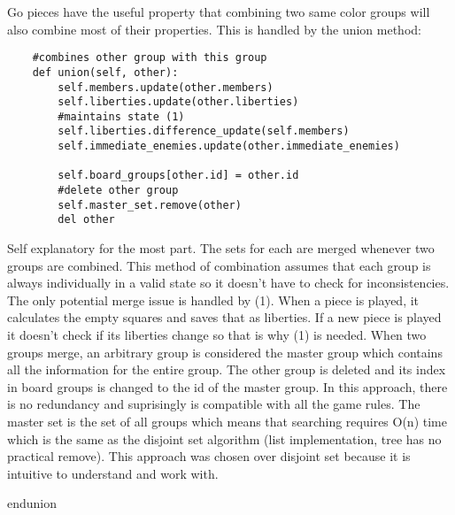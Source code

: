 \documentclass{article}
\begin{document}
        Go pieces have the useful property that combining two same color groups will also combine most of their properties. This is handled by the union method:
\begin{verbatim}
    #combines other group with this group
    def union(self, other):
        self.members.update(other.members)
        self.liberties.update(other.liberties)
        #maintains state (1)
        self.liberties.difference_update(self.members)
        self.immediate_enemies.update(other.immediate_enemies)

        self.board_groups[other.id] = other.id
        #delete other group
        self.master_set.remove(other)
        del other
\end{verbatim}
    Self explanatory for the most part. The sets for each are merged whenever two groups are combined. This method of combination assumes that each group is always individually in a valid state so it doesn't have to check for inconsistencies. The only potential merge issue is handled by (1). When a piece is played, it calculates the empty squares and saves that as liberties. If a new piece is played it doesn't check if its liberties change so that is why (1) is needed.
\linebreak
    When two groups merge, an arbitrary group is considered the master group which contains all the information for the entire group. The other group is deleted and its index in board groups is changed to the id of the master group. In this approach, there is no redundancy and suprisingly is compatible with all the game rules.
\linebreak
    The master set is the set of all groups which means that searching requires O(n) time which is the same as the disjoint set algorithm (list implementation, tree has no practical remove). This approach was chosen over disjoint set because it is intuitive to understand and work with.

end{union}
\end{document}
